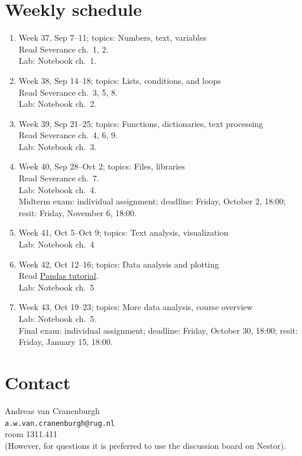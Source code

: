 \documentclass[a4paper,12pt]{article}
\begin{document}
\section{Weekly schedule}\label{sectimetable}
\begin{enumerate}
\item Week 37, Sep 7--11; topics: Numbers, text, variables \\
    Read Severance ch.\ 1, 2.\\
    Lab: Notebook ch.\ 1.

\item Week 38, Sep 14--18; topics: Lists, conditions, and loops \\
    Read Severance ch.\ 3, 5, 8. \\
    Lab: Notebook ch.\ 2.

\item Week 39, Sep 21--25; topics: Functions, dictionaries, text processing \\
    Read Severance ch.\ 4, 6, 9. \\
    Lab: Notebook ch.\ 3.

\item Week 40, Sep 28--Oct 2; topics: Files, libraries \\
    Read Severance ch.\ 7. \\
    Lab: Notebook ch.\ 4. \\
    Midterm exam: individual assignment;
    deadline: Friday, October 2, 18:00;
    resit: Friday, November 6, 18:00.

\item Week 41, Oct 5--Oct 9; topics: Text analysis, visualization \\
    Lab: Notebook ch.\ 4

\item Week 42, Oct 12--16; topics: Data analysis and plotting \\
    Read \href{https://www.learndatasci.com/tutorials/python-pandas-tutorial-complete-introduction-for-beginners/}{Pandas tutorial}. \\
    Lab: Notebook ch.\ 5

\item Week 43, Oct 19--23; topics: More data analysis, course overview \\
    Lab: Notebook ch.\ 5. \\
    Final exam: individual assignment;
    deadline: Friday, October 30, 18:00;
    resit: Friday, January 15, 18:00.
\end{enumerate}

\section{Contact}

Andreas van Cranenburgh\\
\texttt{a.w.van.cranenburgh@rug.nl} \\
room 1311.411 \\
(However, for questions it is preferred to use the discussion board on Nestor).
\end{document}

